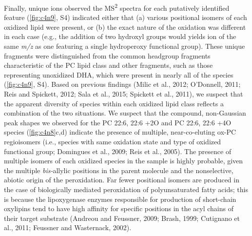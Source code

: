 Finally, unique ions observed the MS\textsuperscript{2} spectra for each putatively identified feature (\autoref{fig:c4n9}, S4) indicated either that (a) various positional isomers of each oxidized lipid were present, or (b) the exact nature of the oxidation was different in each case (e.g., the addition of two hydroxyl groups would yields ion of the same \emph{m/z} as one featuring a single hydroperoxy functional group). These unique fragments were distinguished from the common headgroup fragments characteristic of the PC lipid class and other fragments, such as those representing unoxidized DHA, which were present in nearly all of the species (\autoref{fig:c4n9}, S4). Based on previous findings (Milic et al., 2012; O'Donnell, 2011; Reis and Spickett, 2012; Sala et al., 2015; Spickett et al., 2011), we suspect that the apparent diversity of species within each oxidized lipid class reflects a combination of the two situations. We suspect that the compound, non-Gaussian peak shapes we observed for the PC 22:6, 22:6 +2O and PC 22:6, 22:6 +4O species (\autoref{fig:c4n8}c,d) indicate the presence of multiple, near-co-eluting ox-PC regioisomers (i.e., species with same oxidation state and type of oxidized functional group; Domingues et al., 2009; Reis et al., 2005). The presence of multiple isomers of each oxidized species in the sample is highly probable, given the multiple \emph{bis-}allylic positions in the parent molecule and the nonselective, abiotic origin of the peroxidation. Far fewer positional isomers are produced in the case of biologically mediated peroxidation of polyunsaturated fatty acids; this is because the lipoxygenase enzymes responsible for production of short-chain oxylipins tend to have high affinity for specific positions in the acyl chains of their target substrate (Andreou and Feussner, 2009; Brash, 1999; Cutignano et al., 2011; Feussner and Wasternack, 2002).

